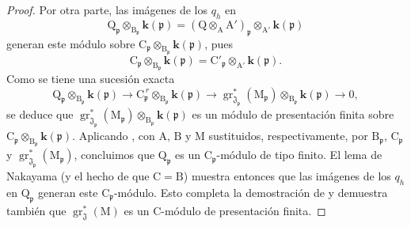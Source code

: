 \begin{proof}
Por otra parte, las imágenes de los $q_h$ en
\[
  \mathrm{Q}_\mathfrak{p}\otimes_{\mathrm{B}_\mathfrak{p}}\boldsymbol{k}(\mathfrak{p})
  =
  (\mathrm{Q}\otimes_\mathrm{A}\mathrm{A}')_\mathfrak{p}
  \otimes_{\mathrm{A}'}\boldsymbol{k}(\mathfrak{p})
\]
generan este módulo sobre $\mathrm{C}_\mathfrak{p}\otimes_{\mathrm{B}_\mathfrak{p}}\boldsymbol{k}(\mathfrak{p})$, pues
\[
  \mathrm{C}_\mathfrak{p}\otimes_{\mathrm{B}_\mathfrak{p}}\boldsymbol{k}(\mathfrak{p})
  =
  \mathrm{C}'_\mathfrak{p}\otimes_{\mathrm{A}'}\boldsymbol{k}(\mathfrak{p}).
\]
Como se tiene una sucesión exacta
\[
  \mathrm{Q}_\mathfrak{p}\otimes_{\mathrm{B}_\mathfrak{p}}\boldsymbol{k}(\mathfrak{p})
  \longrightarrow
  \mathrm{C}_\mathfrak{p}^{\,r}\otimes_{\mathrm{B}_\mathfrak{p}}\boldsymbol{k}(\mathfrak{p})
  \longrightarrow
  \operatorname{gr}^*_{\mathfrak{J}_\mathfrak{p}}(\mathrm{M}_\mathfrak{p})
  \otimes_{\mathrm{B}_\mathfrak{p}}\boldsymbol{k}(\mathfrak{p})
  \longrightarrow 0,
\]
se deduce que $\operatorname{gr}^*_{\mathfrak{J}_\mathfrak{p}}(\mathrm{M}_\mathfrak{p})\otimes_{\mathrm{B}_\mathfrak{p}}\boldsymbol{k}(\mathfrak{p})$ es un módulo de presentación finita sobre $\mathrm{C}_\mathfrak{p}\otimes_{\mathrm{B}_\mathfrak{p}}\boldsymbol{k}(\mathfrak{p})$. Aplicando , con $\mathrm{A}$, $\mathrm{B}$ y $\mathrm{M}$ sustituidos, respectivamente, por $\mathrm{B}_\mathfrak{p}$, $\mathrm{C}_\mathfrak{p}$ y $\operatorname{gr}^*_{\mathfrak{J}_\mathfrak{p}}(\mathrm{M}_\mathfrak{p})$, concluimos que $\mathrm{Q}_\mathfrak{p}$ es un $\mathrm{C}_\mathfrak{p}$-módulo de tipo finito. El lema de Nakayama (y el hecho de que $\mathrm{C}=\mathrm{B}$) muestra entonces que las imágenes de los $q_h$ en $\mathrm{Q}_\mathfrak{p}$ generan este $\mathrm{C}_\mathfrak{p}$-módulo. Esto completa la demostración de  y demuestra también que $\operatorname{gr}^*_\mathfrak{J}(\mathrm{M})$ es un $\mathrm{C}$-módulo de presentación finita.


\end{proof}

